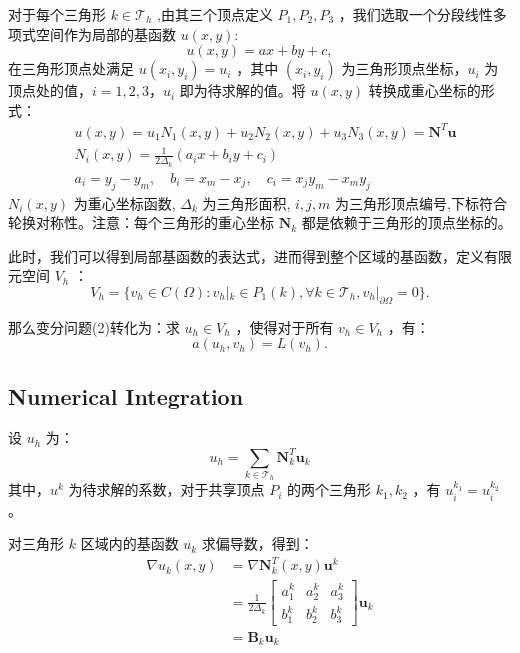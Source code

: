\documentclass[11pt]{ctexart}
\begin{document}
对于每个三角形 $ k\in \mathcal{T}_h $ ,由其三个顶点定义 $ P_1,P_2,P_3 $ ，我们选取一个分段线性多项式空间作为局部的基函数 $ u(x,y) $:
\begin{equation}
      u(x,y) = ax+by+c,
\end{equation}
在三角形顶点处满足 $ u(x_i,y_i) = u_i $ ，其中 $ (x_i,y_i) $ 为三角形顶点坐标，$ u_i $ 为顶点处的值，$ i=1,2,3 $，$ u_i $ 即为待求解的值。将 $ u(x,y) $ 转换成重心坐标的形式：
\begin{equation}
    \begin{aligned}
      &u(x,y) = u_1 N_1(x,y) + u_2 N_2(x,y) + u_3 N_3(x,y)=\mathbf{N}^T \mathbf{u}\\
      &N_i(x,y) = \frac{1}{2\Delta_k} (a_i x + b_i y + c_i)\\
      &a_i = y_j-y_m, \quad b_i = x_m-x_j, \quad c_i = x_j y_m - x_m y_j
    \end{aligned}
\end{equation}
$ N_i(x,y) $ 为重心坐标函数, $ \Delta_k $ 为三角形面积, $ i,j,m $ 为三角形顶点编号,下标符合轮换对称性。注意：每个三角形的重心坐标 $ \mathbf{N}_k $ 都是依赖于三角形的顶点坐标的。

此时，我们可以得到局部基函数的表达式，进而得到整个区域的基函数，定义有限元空间 $ V_h $ ：
\begin{equation}
      V_h = \{ v_h \in C(\Omega) : v_h|_k \in P_1(k), \forall k \in \mathcal{T}_h, v_h|_{\partial \Omega} = 0 \}.
\end{equation}

那么变分问题(2)转化为：求 $ u_h \in V_h $ ，使得对于所有 $ v_h \in V_h $ ，有：
\begin{equation}
     a(u_h,v_h) = L(v_h).
\end{equation}

\subsection{Numerical Integration}
设 $ u_h $ 为：
\begin{equation}
      u_h = \sum_{k\in \mathcal{T}_h} \mathbf{N}_k^T\mathbf{u}_k
\end{equation}
其中，$ u^k $ 为待求解的系数，对于共享顶点 $ P_i $ 的两个三角形 $ k_1,k_2 $ ，有 $ u_i^{k_1} = u_i^{k_2} $。

对三角形 $ k $ 区域内的基函数 $ u_k $ 求偏导数，得到：
\begin{equation}
  \begin{aligned}
    \nabla u_k(x,y) &= \nabla\mathbf{N}_k^T(x,y) \mathbf{u}^k\\
    &=\frac{1}{2\Delta_k}\begin{bmatrix}
      a_1^k & a_2^k & a_3^k\\
      b_1^k & b_2^k & b_3^k
    \end{bmatrix}\mathbf{u}_k\\
    &=\mathbf{B}_k\mathbf{u}_k
  \end{aligned}
\end{equation}
\end{document}
